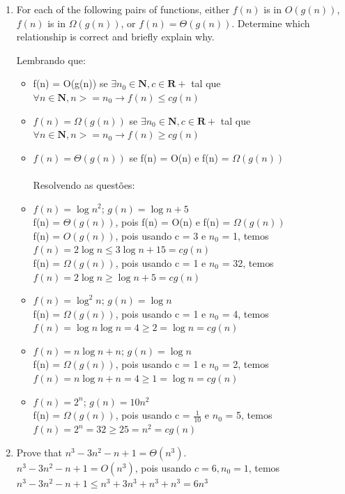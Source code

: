 \documentclass{article}
\begin{document}
\begin{enumerate}[label=\Alph*]
  \item For each of the following pairs of functions, either $f(n)$ is in $O(g(n))$, $f(n)$ is in $\Omega(g(n))$, or $f(n) = \Theta(g(n))$. Determine which relationship is correct and briefly explain why.
  
  Lembrando que: 
  \begin{itemize}
  	\item f(n) = O(g(n)) se $\exists n_{0}\in \mathbf{N}, c \in \mathbf{R+} $ tal que $\forall n \in \mathbf{N}, n>=n_{0} \to f(n) \leq cg(n)$
  	\item $f(n) = \Omega(g(n))$ se $\exists n_{0}\in \mathbf{N}, c \in \mathbf{R+} $ tal que $\forall n \in \mathbf{N}, n>=n_{0} \to f(n) \geq cg(n)$
  	\item $f(n) = \Theta(g(n))$ se f(n) = O(n) e f(n) = $\Omega(g(n))$
  	\\ \\
  	Resolvendo as questões:
  \end{itemize}
    \begin{itemize}
	\item $f(n) = \log n^2$; $g(n) = \log n + 5$ \\
	f(n) = $\Theta (g(n))$, pois f(n) = O(n) e f(n) = $\Omega(g(n))$ \\
	f(n) = $O(g(n))$, pois usando c = 3 e $n_0$ = 1, temos $f(n) = 2\log n \leq 3\log n  + 15 = cg(n)$\\
	f(n) = $\Omega(g(n))$, pois usando c = 1 e $n_0$ = 32, temos $f(n) = 2\log n \geq \log n  + 5 = cg(n)$
      
	\item $f(n) = \log^2 n$; $g(n) = \log n$ \\
	f(n) = $\Omega(g(n))$, pois usando c = 1 e $n_0$ = 4, temos $f(n) = \log n\log n = 4 \geq 2 = \log n = cg(n)$

	\item $f(n) = n\log n + n$; $g(n) = \log n$ \\
	f(n) = $\Omega(g(n))$, pois usando c = 1 e $n_0$ = 2, temos $f(n) = n\log n + n = 4 \geq 1 = \log n = cg(n)$

	\item $f(n) = 2^n$; $g(n) = 10n^2$ \\
	f(n) = $\Omega (g(n))$, pois usando c = $\frac{1}{10}$ e $n_0$ = 5, temos $f(n) = 2^n = 32 \geq 25 = n^2 = cg(n)$
    \end{itemize}
  
  \item Prove that $n^3 -3n^2 -n+1 = \Theta(n^3)$. \\
  $n^3 -3n^2 -n+1 = O(n^3)$, pois usando $c = 6, n_0 = 1$, temos $ n^3 -3n^2 -n+1 \leq n^3 +3n^3 +n^3+n^3  = 6n^3 $
  

\end{enumerate}
\end{document}
